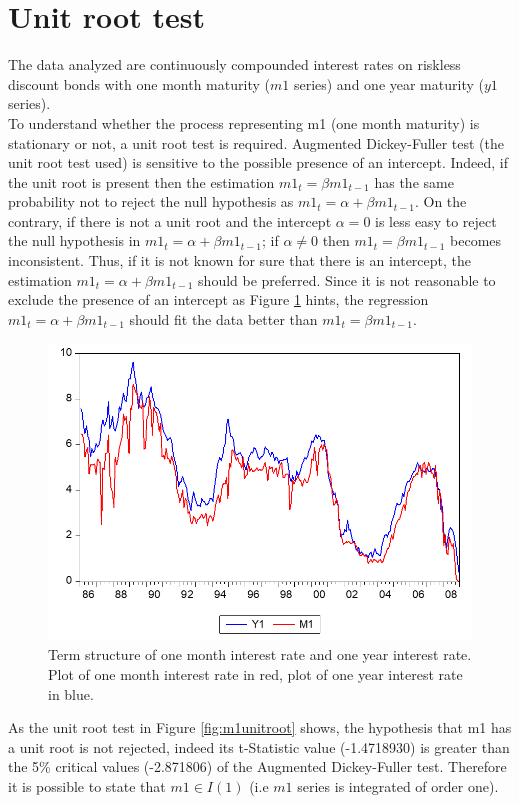 \documentclass[12pt]{article}
\begin{document}
\section{Unit root test} \label{sec:1}
The data analyzed are continuously compounded interest rates on riskless discount bonds with one month maturity ($m1$ series) and one year maturity ($y1$ series).
\\To understand whether the process representing m1 (one month maturity) is stationary or not, a unit root test is required. Augmented Dickey-Fuller test (the unit root test used) is sensitive to the possible presence of an intercept. Indeed, if the unit root is present then  the estimation $ m1_t =  \beta m1_{t-1}$ has the same probability not to reject the null hypothesis as $ m1_t = \alpha + \beta m1_{t-1}$. On the contrary, if there is not a unit root and the intercept $\alpha =  0$ is less easy to reject the null hypothesis in $ m1_t = \alpha + \beta m1_{t-1}$; if $\alpha \neq 0$ then $ m1_t =  \beta m1_{t-1}$ becomes inconsistent. Thus, if it is not known for sure that there is an intercept, the estimation $ m1_t = \alpha + \beta m1_{t-1}$ should be preferred. Since it is not reasonable to exclude the presence of an intercept as Figure \ref{fig:dataplot} hints, the regression $ m1_t = \alpha + \beta m1_{t-1}$ should fit the data better than  $ m1_t =  \beta m1_{t-1}$.
\begin{figure}[H]
\includegraphics[scale=1]{plot.PNG} 
\caption{Term structure of one month interest rate and one year interest rate. Plot of one month interest rate in red, plot of one year interest rate in blue. \label{fig:dataplot}}
\end{figure}
\noindent As the unit root test in Figure \ref{fig:m1unitroot} shows, the hypothesis that m1 has a unit root is not rejected, indeed its t-Statistic value (-1.4718930) is greater than the 5\% critical values (-2.871806) of the Augmented Dickey-Fuller test. Therefore it is possible to state that $m1 \in I(1)$ (i.e $m1$ series is integrated of order one). 
\end{document}
